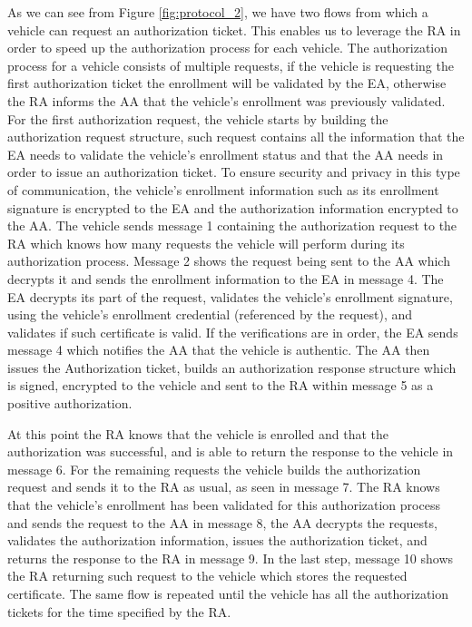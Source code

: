 As we can see from Figure \ref{fig:protocol_2}, we have two flows from which a vehicle can request an authorization ticket. This enables us to leverage the RA in order to speed up the authorization process for each vehicle. The authorization process for a vehicle consists of multiple requests, if the vehicle is requesting the first authorization ticket the enrollment will be validated by the EA, otherwise the RA informs the AA that the vehicle's enrollment was previously validated. For the first authorization request, the vehicle starts by building the authorization request structure, such request contains all the information that the EA needs to validate the vehicle's enrollment status and that the AA needs in order to issue an authorization ticket. To ensure security and privacy in this type of communication, the vehicle's enrollment information such as its enrollment signature is encrypted to the EA and the authorization information encrypted to the AA. The vehicle sends message 1 containing the authorization request to the RA which knows how many requests the vehicle will perform during its authorization process. Message 2 shows the request being sent to the AA which decrypts it and sends the enrollment information to the EA in message 4. The EA decrypts its part of the request, validates the vehicle's enrollment signature, using the vehicle's enrollment credential (referenced by the request), and validates if such certificate is valid. If the verifications are in order, the EA sends message 4 which notifies the AA that the vehicle is authentic. The AA then issues the Authorization ticket, builds an authorization response structure which is signed, encrypted to the vehicle and sent to the RA within message 5 as a positive authorization.

At this point the RA knows that the vehicle is enrolled and that the authorization was successful, and is able to return the response to the vehicle in message 6. For the remaining requests the vehicle builds the authorization request and sends it to the RA as usual, as seen in message 7. The RA knows that the vehicle's enrollment has been validated for this authorization process and sends the request to the AA in message 8, the AA decrypts the requests, validates the authorization information, issues the authorization ticket, and returns the response to the RA in message 9. In the last step, message 10 shows the RA returning such request to the vehicle which stores the requested certificate. The same flow is repeated until the vehicle has all the authorization tickets for the time specified by the RA. 


